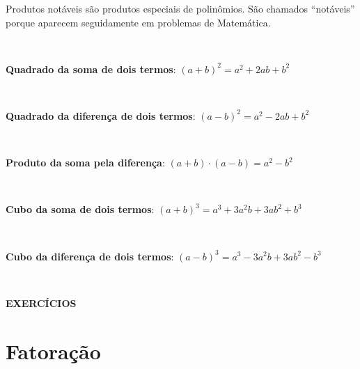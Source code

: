 Produtos notáveis são produtos especiais de polinômios. São chamados “notáveis” porque aparecem seguidamente em problemas de Matemática.

~~

\textbf{Quadrado da soma de dois termos}: $(a+b)^2 = a^2 + 2ab + b^2$

~~

\textbf{Quadrado da diferença de dois termos}: $(a - b)^2 = a^2 - 2ab + b^2$

~~

\textbf{Produto da soma pela diferença}: $(a + b) \cdot (a - b) = a^2 - b^2$

~~

\textbf{Cubo da soma de dois termos}: $(a + b)^3 = a^3 + 3a^2b + 3ab^2 + b^3$

~~

\textbf{Cubo da diferença de dois termos}: $(a - b)^3 = a^3 - 3a^2b + 3ab^2 - b^3$

~~

\noindent\textbf{EXERCÍCIOS \thesubsection}

\begin{enumerate}[label=\thesubsection.\alph*)]
\begin{multicols}{3}
    
    
    
    
    
    
    
    
    
    
    
    
    
    
\end{multicols}
\end{enumerate}

\section{Fatoração}

